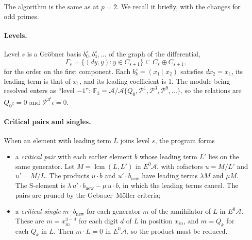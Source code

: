 \documentclass[11pt]{article}
\renewcommand{\P}{\mathcal{P}}
\newcommand{\F}{\mathbb{F}_3}
\newcommand{\A}{\mathcal{A}}
\begin{document}
The algorithm is the same as at $p = 2$. We recall it briefly, with the changes for odd primes.

\paragraph{Levels.}
Level $s$ is a Gröbner basis $b^s_0, b^s_1, \dots$ of the graph of the differential,
\[ \Gamma_s = \{ (d y, y) : y \in C_{s+1} \} \subseteq C_s \oplus C_{s+1}, \]
for the order on the first component. Each $b^s_k = (x_1 \mid x_2)$ satisfies $d x_2 = x_1$, its
leading term is that of $x_1$, and its leading coefficient is $1$. The module being resolved
enters as ``level $-1$'': $\F = \A/\A\{Q_0, \P^1, \P^3, \P^9, \dots\}$, so the relations are
$Q_0\iota = 0$ and $\P^{3^i}\iota = 0$.

\paragraph{Critical pairs and singles.}
When an element with leading term $L$ joins level $s$, the program forms
\begin{itemize}
\item a \emph{critical pair} with each earlier element $b$ whose leading term $L'$ lies on the
  same generator. Let $M = \operatorname{lcm}(L, L')$ in $E^0\A$, with cofactors $u = M/L'$ and
  $u' = M/L$. The products $u\cdot b$ and $u'\cdot b_{\text{new}}$ have leading terms
  $\lambda M$ and $\mu M$. The S-element is $\lambda\, u'\cdot b_{\text{new}} - \mu\, u\cdot b$,
  in which the leading terms cancel. The pairs are pruned by the Gebauer--Möller criteria;
\item a \emph{critical single} $m \cdot b_{\text{new}}$ for each generator $m$ of the
  annihilator of $L$ in $E^0\A$. These are $m = x_{in}^{3-d}$ for each digit $d$ of $L$ in
  position $x_{in}$, and $m = Q_k$ for each $Q_k$ in $L$. Then $m \cdot L = 0$ in $E^0\A$, so
  the product must be reduced.
\end{itemize}
\end{document}
